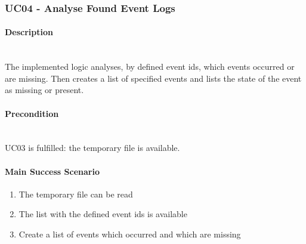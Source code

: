 \subsubsection{UC04 - Analyse Found Event Logs}\label{UC04}
\begin{tcolorbox}
    \paragraph{Description} \ \\
    The implemented logic analyses, by defined event ids, which events occurred or are missing. Then creates a list of specified events and lists the state of the event as missing or present.
    \ \\
    \paragraph{Precondition} \ \\
    UC03 is fulfilled: the temporary file is available.
    \ \\
    \paragraph{Main Success Scenario} 
    \begin{enumerate}
        \item The temporary file can be read
        \item The list with the defined event ids is available
        \item Create a list of events which occurred and which are missing
    \end{enumerate}   
\end{tcolorbox}

